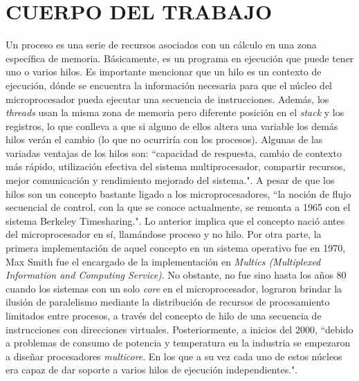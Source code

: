 \documentclass[12pt,letterpaper]{article}
\begin{document}

\section{CUERPO DEL TRABAJO}
Un proceso es una serie de recursos asociados con un cálculo en una zona específica de memoria. Básicamente, es un programa en ejecución que puede tener uno o varios hilos. Es importante mencionar que un hilo es un contexto de ejecución, dónde se encuentra la información necesaria para que el núcleo del microprocesador pueda ejecutar una secuencia de instrucciones. Además, los \textit{threads} usan la misma zona de memoria pero diferente posición en el \textit{stack} y los registros, lo que conlleva a que si alguno de ellos altera una variable los demás hilos verán el cambio (lo que no ocurriría con los procesos).
\newline
\newline
Algunas de las variadas ventajas de los hilos son: ``capacidad de respuesta, cambio de contexto más rápido, utilización efectiva del sistema multiprocesador, compartir recursos, mejor comunicación y rendimiento mejorado del sistema."\cite{c6}.
\newline
\newline
A pesar de que los hilos son un concepto bastante ligado a los microprocesadores, ``la noción de flujo secuencial de control, con la que se conoce actualmente, se remonta a 1965 con el sistema Berkeley Timesharing."\cite{c11}. Lo anterior implica que el concepto nació antes del microprocesador en sí, llamándose proceso y no hilo. Por otra parte, la primera implementación de aquel concepto en un sistema operativo fue en 1970, Max Smith fue el encargado de la implementación en \textit{Multics (Multiplexed Information and Computing Service)}.
\newline
\newline
No obstante, no fue sino hasta los años 80 cuando los sistemas con un solo \textit{core} en el microprocesador, lograron brindar la ilusión de paralelismo mediante la distribución de recursos de procesamiento limitados entre procesos, a través del concepto de hilo de una secuencia de instrucciones con direcciones virtuales. Posteriormente, a inicios del 2000, ``debido a problemas de consumo de potencia y temperatura en la industria se empezaron a diseñar procesadores \textit{multicore}. En los que a su vez cada uno de estos núcleos era capaz de dar soporte a varios hilos de ejecución independientes."\cite{c12}.
\end{document}
